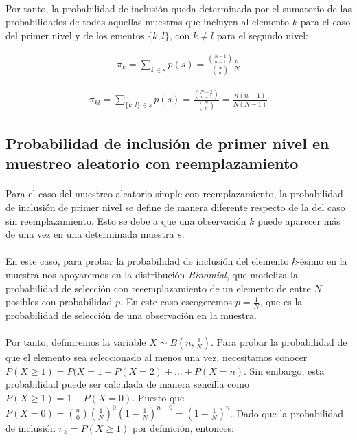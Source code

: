 \documentclass{article}
\begin{document}
      \paragraph{}
      Por tanto, la probabilidad de inclusión queda determinada por el sumatorio de las probabilidades de todas aquellas muestras que incluyen al elemento $k$ para el caso del primer nivel y de los ementos $\{k, l\}$, con $k \neq l$ para el segundo nivel:

      \begin{align}
        \pi_k = \sum_{k \in s}p(s) = \frac{\binom{N-1}{n-1}}{\binom{N}{n}}\frac{n}{N}
      \end{align}

      \begin{align}
        \pi_{kl} = \sum_{\{k,l\} \in s}p(s) = \frac{\binom{N-2}{n-2}}{\binom{N}{n}} = \frac{n(n-1)}{N(N-1)}
      \end{align}

    \subsection{Probabilidad de inclusión de primer nivel en muestreo aleatorio con reemplazamiento}

      \paragraph{}
      Para el caso del muestreo aleatorio simple con reemplazamiento, la probabilidad de inclusión de primer nivel se define de manera diferente respecto de la del caso sin reemplazamiento. Esto se debe a que una observación $k$ puede aparecer más de una vez en una determinada muestra $s$.

      \paragraph{}
      En este caso, para probar la probabilidad de inclusión del elemento $k$-ésimo en la muestra nos apoyaremos en la distribución \emph{Binomial}, que modeliza la probabilidad de selección con reeemplazamiento de un elemento de entre $N$ posibles con probabilidad $p$. En este caso escogeremos $p = \frac{1}{N}$, que es la probabilidad de selección de una observación en la muestra.

      \paragraph{}
      Por tanto, definiremos la variable $X \sim B(n, \frac{1}{N})$. Para probar la probabilidad de que el elemento sea seleccionado al menos una vez, necesitamos conocer $P(X \geq 1) = P(X=1 + P(X=2) + ... + P(X=n)$. Sin embargo, esta probabilidad puede ser calculada de manera sencilla como $P(X \geq 1) = 1- P(X = 0)$. Puesto que $P(X=0) = \binom{n}{0}(\frac{1}{N})^0(1- \frac{1}{N})^{n-0} =\left(1 - \frac{1}{N}\right)^n$. Dado que la probabilidad de inclusión $\pi_k= P(X \geq 1)$ por definición, entonces:
\end{document}
